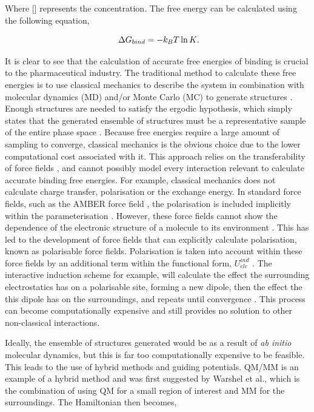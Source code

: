 Where [] represents the concentration.  The free energy can be calculated using the following equation,

\begin{equation}
\ \Delta G_{bind} = -k_B T \ln K \\.
\end{equation}


It is clear to see that the calculation of accurate free energies of binding is crucial to the pharmaceutical industry.  The traditional method to calculate these free energies is to use classical mechanics to describe the system in combination with molecular dynamics (MD) and/or Monte Carlo (MC) to generate structures \cite{jorgensen_free_energy_review, kollman_free_energy_review}.  Enough structures are needed to satisfy the ergodic hypothesis, which simply states that the generated ensemble of structures must be a representative sample of the entire phase space \cite{jensen_quantum}.  Because free energies require a large amount of sampling to converge\cite{kollman_free_energy_review}, classical mechanics is the obvious choice due to the lower computational cost associated with it.  This approach relies on the transferability of force fields \cite{Leach_chem}, and cannot possibly model every interaction relevant to calculate accurate binding free energies.  For example, classical mechanics does not calculate charge transfer, polarisation or the exchange energy.  In standard force fields, such as the AMBER force field \cite{ff99}, the polarisation is included implicitly within the parameterisation \cite{polarisable_force_field_russian}.  However, these force fields cannot show the dependence of the electronic structure of a molecule to its environment \cite{polarisable_force_field_protein_study}.  This has led to the development of force fields that can explicitly calculate polarisation, known as polarisable force fields.  Polarisation is taken into account within these force fields by an additional term within the functional form, $U_{ele}^{ind}$ \cite{protein-ligand_interactions_book}.  The interactive induction scheme for example, will calculate the effect the surrounding electrostatics has on a polarisable site, forming a new dipole, then the effect the this dipole has on the surroundings, and repeats until convergence \cite{Simulate_Phys_world}.  This process can become computationally expensive and still provides no solution to other non-classical interactions.


Ideally, the ensemble of structures generated would be as a result of \textit{ab initio} molecular dynamics, but this is far too computationally expensive to be feasible.  This leads to the use of hybrid methods and guiding potentials.  QM/MM is an example of a hybrid method and was first suggested by Warshel et al.\cite{warhsel_qm-mm}, which is the combination of using QM for a small region of interest and MM for the surroundings.  The Hamiltonian then becomes,

